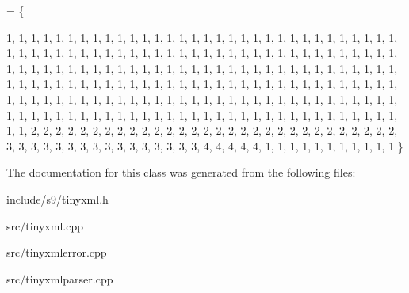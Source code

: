 \begin{DoxyCode}
= 
\{
    
        1,  1,  1,  1,  1,  1,  1,  1,  1,  1,  1,  1,  1,  1,  1,  1,  
        1,  1,  1,  1,  1,  1,  1,  1,  1,  1,  1,  1,  1,  1,  1,  1,  
        1,  1,  1,  1,  1,  1,  1,  1,  1,  1,  1,  1,  1,  1,  1,  1,  
        1,  1,  1,  1,  1,  1,  1,  1,  1,  1,  1,  1,  1,  1,  1,  1,  
        1,  1,  1,  1,  1,  1,  1,  1,  1,  1,  1,  1,  1,  1,  1,  1,  
        1,  1,  1,  1,  1,  1,  1,  1,  1,  1,  1,  1,  1,  1,  1,  1,  
        1,  1,  1,  1,  1,  1,  1,  1,  1,  1,  1,  1,  1,  1,  1,  1,  
        1,  1,  1,  1,  1,  1,  1,  1,  1,  1,  1,  1,  1,  1,  1,  1,  
        1,  1,  1,  1,  1,  1,  1,  1,  1,  1,  1,  1,  1,  1,  1,  1,  
        1,  1,  1,  1,  1,  1,  1,  1,  1,  1,  1,  1,  1,  1,  1,  1,  
        1,  1,  1,  1,  1,  1,  1,  1,  1,  1,  1,  1,  1,  1,  1,  1,  
        1,  1,  1,  1,  1,  1,  1,  1,  1,  1,  1,  1,  1,  1,  1,  1,  
        1,  1,  2,  2,  2,  2,  2,  2,  2,  2,  2,  2,  2,  2,  2,  2,  
        2,  2,  2,  2,  2,  2,  2,  2,  2,  2,  2,  2,  2,  2,  2,  2,  
        3,  3,  3,  3,  3,  3,  3,  3,  3,  3,  3,  3,  3,  3,  3,  3,  
        4,  4,  4,  4,  4,  1,  1,  1,  1,  1,  1,  1,  1,  1,  1,  1   
\}
\end{DoxyCode}


The documentation for this class was generated from the following files\-:\begin{DoxyCompactItemize}
\item 
include/s9/tinyxml.\-h\item 
src/tinyxml.\-cpp\item 
src/tinyxmlerror.\-cpp\item 
src/tinyxmlparser.\-cpp\end{DoxyCompactItemize}
